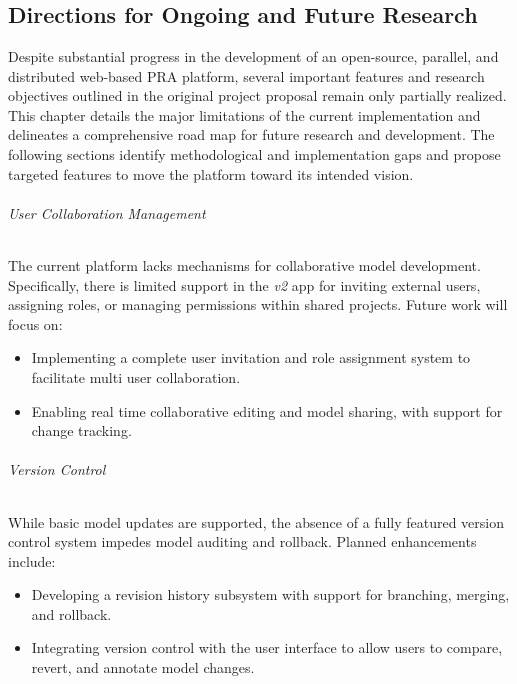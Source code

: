 \part{\color{blue}{Future Work}}

\chapter{Directions for Ongoing and Future Research}

Despite substantial progress in the development of an open-source, parallel, and distributed web-based PRA platform, several important features and research objectives outlined in the original project proposal remain only partially realized. This chapter details the major limitations of the current implementation and delineates a comprehensive road map for future research and development. The following sections identify methodological and implementation gaps and propose targeted features to move the platform toward its intended vision.

\paragraph{User Collaboration Management}

The current platform lacks mechanisms for collaborative model development. Specifically, there is limited support in the \textit{v2} app for inviting external users, assigning roles, or managing permissions within shared projects. Future work will focus on:

\begin{itemize}
    \item Implementing a complete user invitation and role assignment system to facilitate multi user collaboration.
    \item Enabling real time collaborative editing and model sharing, with support for change tracking.
\end{itemize}

\paragraph{Version Control}

While basic model updates are supported, the absence of a fully featured version control system impedes model auditing and rollback. Planned enhancements include:
\begin{itemize}
    \item Developing a revision history subsystem with support for branching, merging, and rollback.
    \item Integrating version control with the user interface to allow users to compare, revert, and annotate model changes.
\end{itemize}

